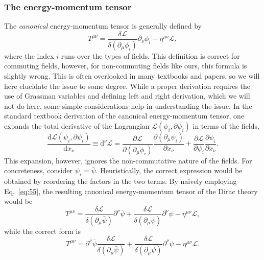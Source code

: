 \subsubsection{The energy-momentum tensor}
The \emph{canonical} energy-momentum tensor is generally defined by
\begin{equation}
  \label{eq:55}
  T^{\mu \nu} =  \frac{\delta \mathcal{L}}{\delta(\partial_{\mu} \phi_{i})} \partial_{\nu} \phi_i - \eta^{\mu \nu} \mathcal{L},
\end{equation}
where the index \( i \) runs over the types of fields.
This definition is correct for commuting fields, however, for non-commuting fields like ours, this formula is slightly wrong.
This is often overlooked in many textbooks and papers, so we will here elucidate the issue to some degree.
While a proper derivation requires the use of Grassman variables and defining left and right derivation, which we will not do here, some simple considerations help in understanding the issue.
In the standard textbook derivation of the canonical energy-momentum tensor, one expands the total derivative of the Lagrangian \( \mathcal{L}(\psi_i, \partial \psi_i)\) in terms of the fields,
\begin{equation}
  \label{eq:56}
  \frac{\mathrm{d} \mathcal{L}(\psi_{i}, \partial \psi_i)}{\mathrm{d} x_{\nu }} \equiv \mathrm{d}^{\nu } \mathcal{L}
  = \frac{\partial \mathcal{L}}{\partial (\partial_{\mu } \phi_i)} \frac{\partial(\partial _{\mu } \psi_i)}{\partial x_{\nu }}
  + \frac{\partial \mathcal{L}}{\partial \psi _{i}} \frac{\partial \psi_i}{\partial x_{\nu }}.
\end{equation}
This expansion, however, ignores the non-commutative nature of the fields.
For concreteness, consider \( \psi _i = \bar{\psi} \).
Heuristically, the correct expression would be obtained by reordering the factors in the two terms.
By naively employing Eq.~\eqref{eq:55}, the resulting canonical energy-momentum tensor of the Dirac theory would be
\begin{equation}
  T^{\mu \nu} = \frac{\delta \mathcal{L}}{\delta (\partial_{\mu} \bar{\psi})} \partial^{\nu} \bar{\psi}  + \frac{\delta \mathcal{L}}{\delta (\partial_{\mu} \psi)} \partial^{\nu} \psi - \eta^{\mu \nu} \mathcal{L},
\end{equation}
while the correct form is \cite[Eq.~3-153]{itzyksonQuantumFieldTheory1980}
\begin{equation}
  \label{eq:57}
  T^{\mu \nu} = \partial^{\nu} \bar{\psi} \frac{\delta \mathcal{L}}{\delta (\partial_{\mu} \bar{\psi})} + \frac{\delta \mathcal{L}}{\delta (\partial_{\mu} \psi)} \partial^{\nu} \psi - \eta^{\mu \nu} \mathcal{L}.
\end{equation}

